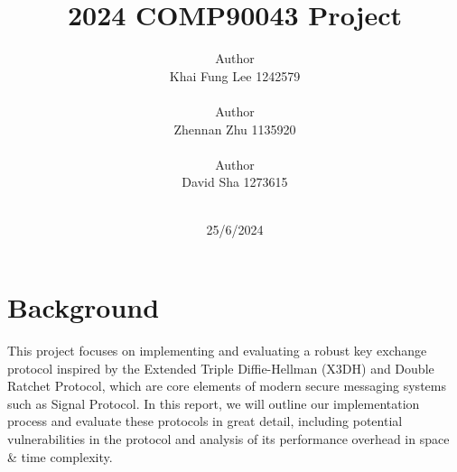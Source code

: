 \documentclass[11pt]{article}
\title{2024 COMP90043 Project}
\author{Author \\
Khai Fung Lee 1242579 \\
   \\\And
  Author \\
  Zhennan Zhu  1135920\\
  \\\And
  Author \\
  David Sha  1273615\\
  \\}
\date{25/6/2024}
\begin{document}
\maketitle
\begin{abstract}

\end{abstract}

\section{Background}
This project focuses on implementing and evaluating a robust key exchange protocol inspired by the Extended Triple Diffie-Hellman (X3DH) and Double Ratchet Protocol, which are core elements of modern secure messaging systems such as Signal Protocol. In this report, we will outline our implementation process and evaluate these protocols in great detail, including potential vulnerabilities in the protocol and analysis of its performance overhead in space \& time complexity.
\end{document}
